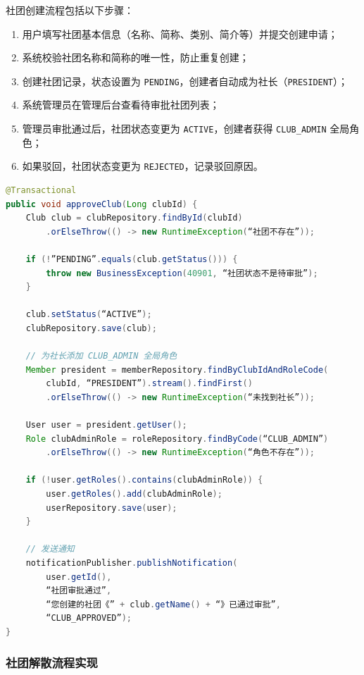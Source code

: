社团创建流程包括以下步骤：

\begin{enumerate}
  \item 用户填写社团基本信息（名称、简称、类别、简介等）并提交创建申请；
  \item 系统校验社团名称和简称的唯一性，防止重复创建；
  \item 创建社团记录，状态设置为 \texttt{PENDING}，创建者自动成为社长（\texttt{PRESIDENT}）；
  \item 系统管理员在管理后台查看待审批社团列表；
  \item 管理员审批通过后，社团状态变更为 \texttt{ACTIVE}，创建者获得 \texttt{CLUB\_ADMIN} 全局角色；
  \item 如果驳回，社团状态变更为 \texttt{REJECTED}，记录驳回原因。
\end{enumerate}

\begin{lstlisting}[language=Java, caption=社团审批实现（节选）]
@Transactional
public void approveClub(Long clubId) {
    Club club = clubRepository.findById(clubId)
        .orElseThrow(() -> new RuntimeException(“社团不存在”));

    if (!”PENDING”.equals(club.getStatus())) {
        throw new BusinessException(40901, “社团状态不是待审批”);
    }

    club.setStatus(“ACTIVE”);
    clubRepository.save(club);

    // 为社长添加 CLUB_ADMIN 全局角色
    Member president = memberRepository.findByClubIdAndRoleCode(
        clubId, “PRESIDENT”).stream().findFirst()
        .orElseThrow(() -> new RuntimeException(“未找到社长”));

    User user = president.getUser();
    Role clubAdminRole = roleRepository.findByCode(“CLUB_ADMIN”)
        .orElseThrow(() -> new RuntimeException(“角色不存在”));

    if (!user.getRoles().contains(clubAdminRole)) {
        user.getRoles().add(clubAdminRole);
        userRepository.save(user);
    }

    // 发送通知
    notificationPublisher.publishNotification(
        user.getId(),
        “社团审批通过”,
        “您创建的社团《” + club.getName() + “》已通过审批”,
        “CLUB_APPROVED”);
}
\end{lstlisting}

\subsubsection{社团解散流程实现}

